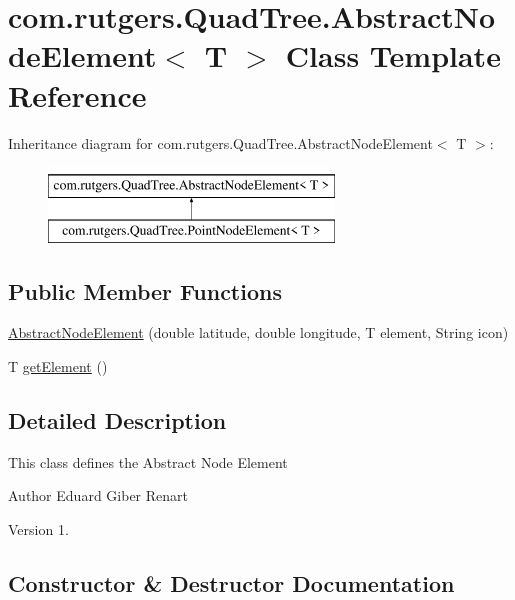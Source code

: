 \hypertarget{classcom_1_1rutgers_1_1QuadTree_1_1AbstractNodeElement}{}\section{com.\+rutgers.\+Quad\+Tree.\+Abstract\+Node\+Element$<$ T $>$ Class Template Reference}
\label{classcom_1_1rutgers_1_1QuadTree_1_1AbstractNodeElement}
Inheritance diagram for com.\+rutgers.\+Quad\+Tree.\+Abstract\+Node\+Element$<$ T $>$\+:\begin{figure}[H]
\begin{center}
\leavevmode
\includegraphics[height=2.000000cm]{classcom_1_1rutgers_1_1QuadTree_1_1AbstractNodeElement}
\end{center}
\end{figure}
\subsection*{Public Member Functions}
\begin{DoxyCompactItemize}
\item 
\hyperlink{classcom_1_1rutgers_1_1QuadTree_1_1AbstractNodeElement_ac5c8142d561f6f7f8c5c974164f4166a}{Abstract\+Node\+Element} (double latitude, double longitude, T element, String icon)
\item 
T \hyperlink{classcom_1_1rutgers_1_1QuadTree_1_1AbstractNodeElement_a8c24420f3c2acca151a1283773afd769}{get\+Element} ()
\end{DoxyCompactItemize}


\subsection{Detailed Description}
This class defines the Abstract Node Element

\begin{DoxyAuthor}{Author}
Eduard Giber Renart 
\end{DoxyAuthor}
\begin{DoxyVersion}{Version}
1. 
\end{DoxyVersion}


\subsection{Constructor \& Destructor Documentation}
\mbox{\label{classcom_1_1rutgers_1_1QuadTree_1_1AbstractNodeElement_ac5c8142d561f6f7f8c5c974164f4166a}} 
